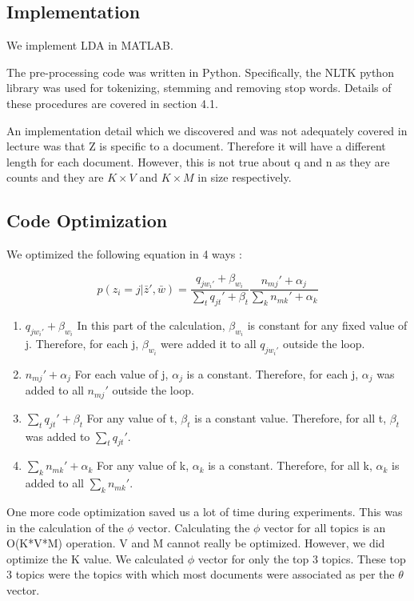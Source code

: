 \documentclass[11pt,a4paper,oneside]{article}
\begin{document}
\subsection{Implementation}
We implement LDA in \textsc{MATLAB}.

The pre-processing code was written in Python. Specifically, the NLTK python library was used for tokenizing, stemming and removing stop words. Details of these procedures are covered in section 4.1.

An implementation detail which we discovered and was not adequately covered in lecture was that Z is specific to a document. Therefore it will have a different length for each document. However, this is not true about q and n as they are counts and they are $K \times V$ and $K \times M$ in size respectively.

\subsection{Code Optimization}
We optimized the following equation in 4 ways :

\begin{equation}
p(z_i = j | \bar{z}', \bar{w}) = \frac{q_{j w_{i}'} + \beta_{w_i}}{\sum_t{q_{jt}' + \beta_t}}\frac{n_{mj}' + \alpha_j}{\sum_k{n_{mk}' + \alpha_k}}
\end{equation}

\begin{enumerate}
\item $q_{j w_{i}'}+\beta_{w_i}$ In this part of the calculation, $\beta_{w_i}$ is constant for any fixed value of j. Therefore, for each j, $\beta_{w_i}$ were added it to all $q_{j w_{i}'}$ outside the loop. 
\item $n_{mj}' + \alpha_j$ For each value of j, $\alpha_j$ is a constant. Therefore, for each j, $\alpha_j$ was added to all $n_{mj}'$ outside the loop.
\item $\sum_t{q_{jt}' + \beta_t}$ For any value of t, $\beta_t$ is a constant value. Therefore, for all t, $\beta_t$ was added to $\sum_t{q_{jt}}'$.
\item $\sum_k{n_{mk}' + \alpha_k}$ For any value of k, $\alpha_k$ is a constant. Therefore, for all k, $\alpha_k$ is added to all $\sum_k{n_{mk}}'$.
\end{enumerate}

\bigskip
One more code optimization saved us a lot of time during experiments. This was in the calculation of the $\phi$ vector. Calculating the $\phi$ vector for all topics is an O(K*V*M) operation. V and M cannot really be optimized. However, we did optimize the K value. We calculated $\phi$ vector for only the top 3 topics. These top 3 topics were the topics with which most documents were associated as per the $\theta$ vector.
\end{document}
